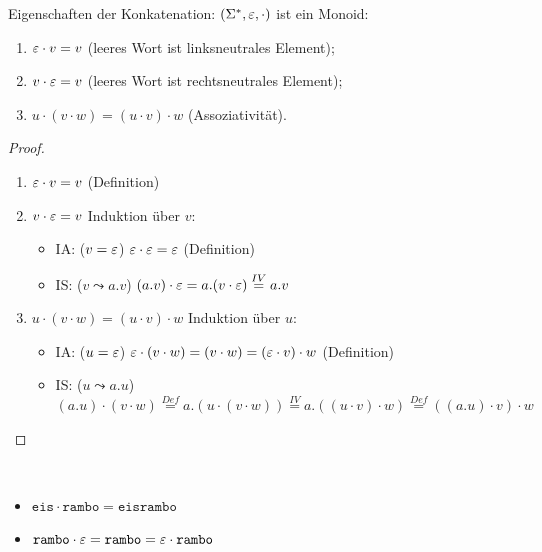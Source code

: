 \begin{lemma}
Eigenschaften der Konkatenation: $(\Sigma^*, \varepsilon, \cdot)$ ist ein Monoid:
\begin{enumerate}
\item $\varepsilon\cdot v = v$ (leeres Wort ist linksneutrales Element);
\item $v\cdot \varepsilon = v$ (leeres Wort ist rechtsneutrales Element);
\item $u\cdot (v \cdot w) = (u\cdot v) \cdot w$ (Assoziativität).
\end{enumerate}
\end{lemma}
\begin{proof}
\begin{enumerate}
\item $\varepsilon\cdot v = v$ (Definition)
\item $v\cdot \varepsilon = v$ Induktion über $v$:
  \begin{itemize}
  \item IA: ($v = \varepsilon$)   $\varepsilon \cdot \varepsilon = \varepsilon$ (Definition)
  \item IS: ($v \leadsto a.v$)   $(a.v)\cdot \varepsilon = a.(v \cdot \varepsilon)
    \stackrel{IV}{=} a.v$
  \end{itemize}
\item $u\cdot (v \cdot w) = (u\cdot v) \cdot w$ Induktion über $u$:
  \begin{itemize}
  \item IA: ($u = \varepsilon$)  $\varepsilon\cdot (v \cdot w) = (v \cdot w) =
    (\varepsilon\cdot v) \cdot w$ (Definition)
  \item IS: ($u \leadsto a.u$)
    $(a.u) \cdot (v \cdot w) \stackrel{Def}{=} a.(u\cdot (v \cdot w))
    \stackrel{IV}{=} a.( (u\cdot v) \cdot w) \stackrel{Def}{=} ((a.u)\cdot v) \cdot w$
  \end{itemize}
\end{enumerate}
\end{proof}
\begin{Bsp*} ~
  \begin{itemize}
  \item $\mathtt{eis}\cdot\mathtt{rambo} =\mathtt{eisrambo}$
  \item $\mathtt{rambo} \cdot \varepsilon = \mathtt{rambo} = \varepsilon \cdot \mathtt{rambo}$ 
  \qedhere
  \end{itemize}
\end{Bsp*}


